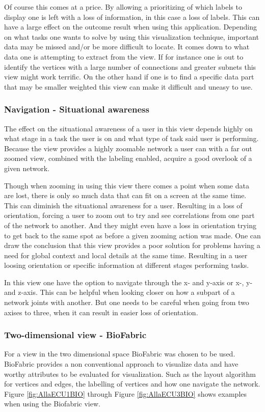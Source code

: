 \documentclass[a4paper,11pt]{kth-mag}
\begin{document}
Of course this comes at a price. By allowing a prioritizing of which labels to display one is left with a
loss of information, in this case a loss of labels. This can have a large effect on the outcome result when using
this application. Depending on what tasks one wants to solve by using this visualization technique, important
data may be missed and/or be more difficult to locate. It comes down to what data one is attempting to extract
from the view. If for instance one is out to identify the vertices with a large number of connections and greater subnets
this view might work terrific. On the other hand if one is to find a specific data part that may be smaller weighted this view can make it difficult and uneasy to use.
\subsubsection{Navigation - Situational awareness}
The effect on the situational awareness of a user in this view depends highly on what stage in a task the user is on and what type of task said user is performing. Because the view
provides a highly zoomable network a user can with a far out zoomed view, combined with the labeling enabled, acquire a good overlook of a given network.

Though when zooming in using this view there comes a point when some data are lost, there
is only so much data that can fit on a screen at the same time. This can diminish the situational awareness for a user. Resulting in
a loss of orientation, forcing a user to zoom out to try and see correlations from one part of the network to another. And they might even have a loss in orientation trying to get back to the same spot as before a given 
zooming action was made. One can draw the conclusion that this view provides a poor solution for problems having a need for global context and local details at the same time. Resulting in a user loosing orientation or 
specific information at different stages performing tasks.

In this view one have the option to navigate through the x- and y-axis or x-, y- and z-axis. This can be helpful when looking closer on how a subpart of a network joints with another. But one needs to be careful 
when going from two axises to three, when it can result in easier loss of orientation.

\subsubsection{Two-dimensional view - BioFabric}
For a view in the two dimensional space BioFabric was chosen to be used. BioFabric provides a non conventional approach to visualize data and have worthy attributes to be evaluated for visualization. 
Such as the layout algorithm for vertices and edges, the labelling of vertices and how one navigate the network. Figure \ref{fig:AllaECU1BIO} through Figure \ref{fig:AllaECU3BIO} shows examples when using the Biofabric view.
 
\end{document}
